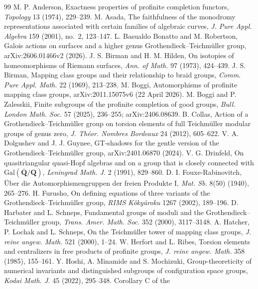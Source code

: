 \documentclass[11pt,a4paper]{article}
\theoremstyle{plain}
\theoremstyle{definition}
\theoremstyle{remark}
\begin{document}
\begin{thebibliography}{99}\small
{} M. P. Anderson, Exactness properties of profinite completion functors, \emph{Topology} 13 (1974),
229--239.
 M. Asada, The faithfulness of the monodromy representations associated with certain families of
algebraic curves, \emph{J. Pure Appl. Algebra} 159 (2001), no.~2, 123--147.
 L. Basualdo Bonatto and M. Robertson, Galois actions on surfaces and a higher genus
Grothendieck--Teichm\"uller group, arXiv:2606.01466v2 (2026).
 J. S. Birman and H. M. Hilden, On isotopies of homeomorphisms of Riemann surfaces, \emph{Ann. of Math.}
97 (1973), 424--439.
 J. S. Birman, Mapping class groups and their relationship to braid groups, \emph{Comm. Pure Appl.
Math.} 22 (1969), 213--238.
 M. Boggi, Automorphisms of profinite mapping class groups, arXiv:2011.15075v6 (22 April 2026).
 M. Boggi and P. Zalesskii, Finite subgroups of the profinite completion of good groups, \emph{Bull.
London Math. Soc.} 57 (2025), 236--255; arXiv:2406.08639.
 B. Collas, Action of a Grothendieck--Teichm\"uller group on torsion elements of full Teichm\"uller
modular groups of genus zero, \emph{J. Th\'eor. Nombres Bordeaux} 24 (2012), 605--622.
 V. A. Dolgushev and J. J. Guynee, GT-shadows for the gentle version of the Grothendieck--Teichm\"uller
group, arXiv:2401.06870 (2024).
 V. G. Drinfeld, On quasitriangular quasi-Hopf algebras and on a group that is closely connected with
$\mathrm{Gal}(\overline{\mathbf Q}/\mathbf Q)$, \emph{Leningrad Math. J.} 2 (1991), 829--860.
 D. I. Fouxe-Rabinovitch, \"Uber die Automorphismengruppen der freien Produkte I, \emph{Mat. Sb.} 8(50)
(1940), 265--276.
 H. Furusho, On defining equations of three variants of the Grothendieck--Teichm\"uller group,
\emph{RIMS K\^oky\^uroku} 1267 (2002), 189--196.
 D. Harbater and L. Schneps, Fundamental groups of moduli and the Grothendieck--Teichm\"uller group,
\emph{Trans. Amer. Math. Soc.} 352 (2000), 3117--3148.
 A. Hatcher, P. Lochak and L. Schneps, On the Teichm\"uller tower of mapping class groups, \emph{J.
reine angew. Math.} 521 (2000), 1--24.
 W. Herfort and L. Ribes, Torsion elements and centralizers in free products of profinite groups,
\emph{J. reine angew. Math.} 358 (1985), 155--161.
 Y. Hoshi, A. Minamide and S. Mochizuki, Group-theoreticity of numerical invariants and distinguished
subgroups of configuration space groups, \emph{Kodai Math. J.} 45 (2022), 295--348. Corollary C of the

\end{thebibliography}
\end{document}
